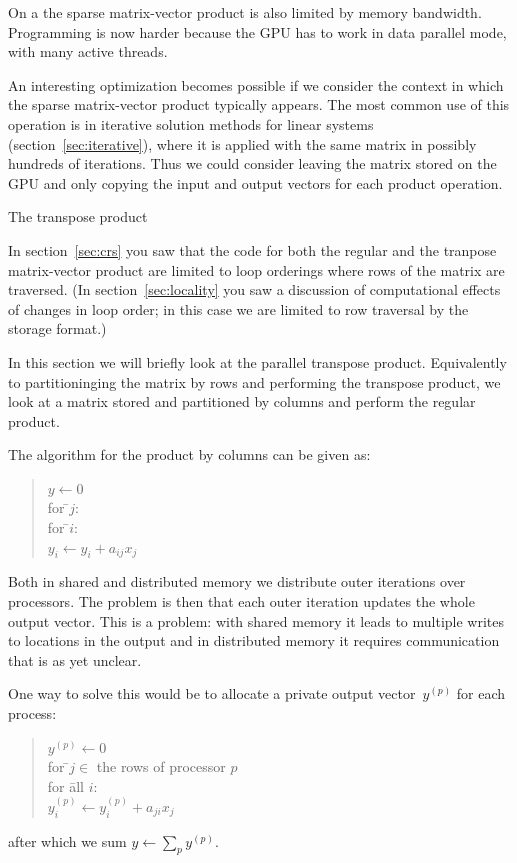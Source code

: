 On a  the sparse matrix-vector product is also limited by
memory bandwidth. Programming is now harder because the \ac{GPU} has
to work in data parallel mode, with many active threads. 

An
interesting optimization becomes possible if we consider the context
in which the sparse matrix-vector product typically appears. The most
common use of this operation is in iterative solution methods for
linear systems (section~\ref{sec:iterative}), where it is applied with
the same matrix in possibly hundreds of iterations. Thus we could
consider leaving the matrix stored on the GPU and only copying the
input and output vectors for each product operation.


 {The transpose product}
\label{sec:shared-crs-transpose}

In section~\ref{sec:crs} you saw that the code for both the regular
and the tranpose matrix-vector product are limited to loop orderings
where rows of the matrix are traversed. (In section~\ref{sec:locality}
you saw a discussion of computational effects of changes in loop
order; in this case we are limited to row traversal by the storage
format.) 

In this section we will briefly look at the parallel transpose
product. Equivalently to partitioninging the matrix by rows and
performing the transpose product, we look at a matrix stored and
partitioned by columns and perform the regular product.

The  algorithm for the product by columns can be given as:
\begin{quote}
    \begin{tabbing}
      $y\leftarrow 0$\\
      for \=$j$:\\
      \> for \=$i$:\\
      \>\> $y_i\leftarrow y_i+a_{ij}x_j$
    \end{tabbing}
\end{quote}
Both in shared and distributed memory we distribute outer iterations
over processors. The problem is then that each outer iteration updates
the whole output vector. This is a problem: with shared memory it
leads to multiple writes to locations in the output and in distributed
memory it requires communication that is as yet unclear.

One way to solve this would be to allocate a private output
vector~$y^{(p)}$ for each process:
\begin{quote}
    \begin{tabbing}
      $y^{(p)}\leftarrow 0$\\
      for \=$j\in$ the rows of processor $p$\\
      \> for \=all $i$:\\
      \>\> $y^{(p)}_i\leftarrow y^{(p)}_i+a_{ji}x_j$
    \end{tabbing}
\end{quote}
after which we sum $y\leftarrow\sum_py^{(p)}$.

